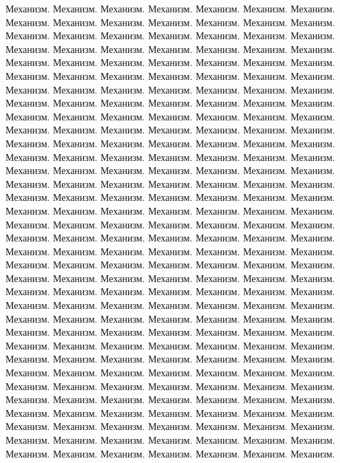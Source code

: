 Механизм. Механизм. Механизм. Механизм. Механизм. Механизм. Механизм. Механизм.
 Механизм. Механизм. Механизм. Механизм. Механизм. Механизм. Механизм. Механизм. 
 Механизм. Механизм. Механизм. Механизм. Механизм. Механизм. Механизм. Механизм.
  Механизм. Механизм. Механизм. Механизм. Механизм. Механизм. Механизм. Механизм. 
  Механизм. Механизм. Механизм. Механизм. Механизм. Механизм. Механизм. Механизм.
   Механизм. Механизм. Механизм. Механизм. Механизм. Механизм. Механизм. Механизм. 
   Механизм. Механизм. Механизм. Механизм. Механизм. Механизм. Механизм. Механизм.
    Механизм. Механизм. Механизм. Механизм. Механизм. Механизм. Механизм. Механизм. 
    Механизм. Механизм. Механизм. Механизм. Механизм. Механизм. Механизм. Механизм.
     Механизм. Механизм. Механизм. Механизм. Механизм. Механизм. Механизм. Механизм. 
     Механизм. Механизм. Механизм. Механизм. Механизм. Механизм. Механизм. Механизм.
      Механизм. Механизм. Механизм. Механизм. Механизм. Механизм. Механизм. Механизм. 
      Механизм. Механизм. Механизм. Механизм. Механизм. Механизм. Механизм. Механизм.
       Механизм. Механизм. Механизм. Механизм. Механизм. Механизм. Механизм. Механизм. 
       Механизм. Механизм. Механизм. Механизм. Механизм. Механизм. Механизм. Механизм.
        Механизм. Механизм. Механизм. Механизм. Механизм. Механизм. Механизм. Механизм. 
        Механизм. Механизм. Механизм. Механизм. Механизм. Механизм. Механизм. Механизм.
         Механизм. Механизм. Механизм. Механизм. Механизм. Механизм. Механизм. Механизм. 
         Механизм. Механизм. Механизм. Механизм. Механизм. Механизм. Механизм. Механизм.
          Механизм. Механизм. Механизм. Механизм. Механизм. Механизм. Механизм. Механизм. 
          Механизм. Механизм. Механизм. Механизм. Механизм. Механизм. Механизм. Механизм.
           Механизм. Механизм. Механизм. Механизм. Механизм. Механизм. Механизм. Механизм. 
           Механизм. Механизм. Механизм. Механизм. Механизм. Механизм. Механизм. Механизм.
            Механизм. Механизм. Механизм. Механизм. Механизм. Механизм. Механизм. Механизм. 
            Механизм. Механизм. Механизм. Механизм. Механизм. Механизм. Механизм. Механизм.
             Механизм. Механизм. Механизм. Механизм. Механизм. Механизм. Механизм. Механизм. 
             Механизм. Механизм. Механизм. Механизм. Механизм. Механизм. Механизм. Механизм.
              Механизм. Механизм. Механизм. Механизм. Механизм. Механизм. Механизм. Механизм. 
              Механизм. Механизм. Механизм. Механизм. Механизм. Механизм. Механизм. Механизм.
               Механизм. Механизм. Механизм. Механизм. Механизм. Механизм. 

